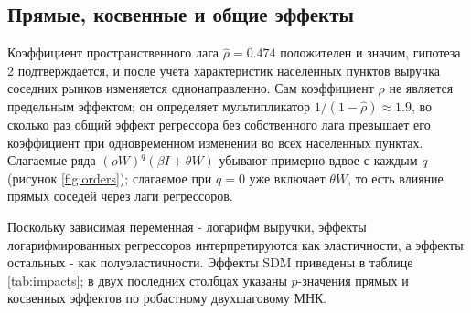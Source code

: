 \documentclass[12pt, a4paper]{article}
\begin{document}
\subsection*{Прямые, косвенные и общие эффекты}

Коэффициент пространственного лага $\hat{\rho} = 0.474$ положителен и значим, гипотеза 2
подтверждается, и после учета характеристик населенных пунктов выручка соседних рынков изменяется
однонаправленно. Сам коэффициент $\rho$ не является предельным эффектом; он определяет
мультипликатор $1 / (1 - \hat{\rho}) \approx 1.9$, во сколько раз общий эффект регрессора без
собственного лага превышает его коэффициент при одновременном изменении во всех населенных пунктах. Слагаемые
ряда $(\rho W)^q (\beta I + \theta W)$ убывают примерно вдвое с каждым $q$ (рисунок
\ref{fig:orders}); слагаемое при $q = 0$ уже включает $\theta W$, то есть влияние прямых соседей
через лаги регрессоров.

Поскольку зависимая переменная - логарифм выручки, эффекты логарифмированных регрессоров
интерпретируются как эластичности, а эффекты остальных - как полуэластичности. Эффекты SDM
приведены в таблице \ref{tab:impacts}; в двух последних столбцах указаны $p$-значения прямых и
косвенных эффектов по робастному двухшаговому МНК.
\end{document}
